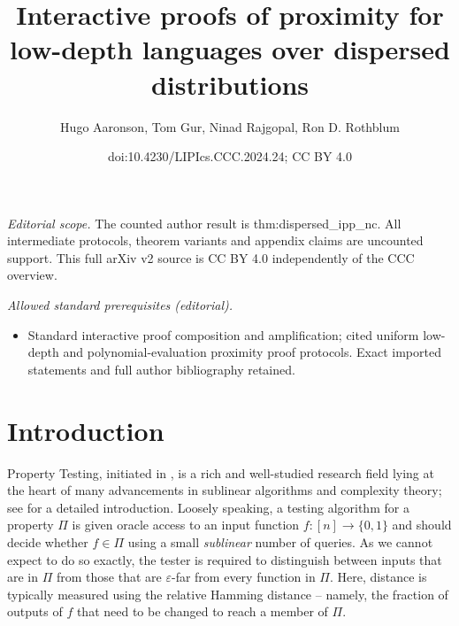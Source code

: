 \documentclass[10pt,a4paper]{article}
\title{Interactive proofs of proximity for low-depth languages over dispersed distributions}
\author{Hugo Aaronson, Tom Gur, Ninad Rajgopal, Ron D. Rothblum}
\date{doi:10.4230/LIPIcs.CCC.2024.24; CC BY 4.0}
\begin{document}
\maketitle
\setcounter{section}{1}
\noindent\textit{Editorial scope.} The counted author result is thm:dispersed\_ipp\_nc. All intermediate protocols, theorem variants and appendix claims are uncounted support. This full arXiv v2 source is CC BY 4.0 independently of the CCC overview.\par\medskip
\noindent\textit{Allowed standard prerequisites (editorial).}\begin{itemize}
\item Standard interactive proof composition and amplification; cited uniform low-depth and polynomial-evaluation proximity proof protocols. Exact imported statements and full author bibliography retained.
\end{itemize}\medskip
\section{Introduction}
Property Testing, initiated in \cite{RS96, GGR98}, is a rich and well-studied research field lying at the heart of many advancements in sublinear algorithms and complexity theory; see \cite{Gol17_book,BY22} for a detailed introduction. Loosely speaking, a testing algorithm for a property $\Pi$ is given oracle access to an input function $f:[n]\rightarrow\{0,1\}$ and should decide whether $f \in \Pi$ using a small \emph{sublinear} number of queries. As  we cannot expect to do so exactly, the tester is required to distinguish between inputs that are in $\Pi$ from those that are $\varepsilon$-far from every function in $\Pi$. Here, distance is typically measured using the relative Hamming distance -- namely, the fraction of outputs of $f$ that need to be changed to reach a member of $\Pi$.
\end{document}
